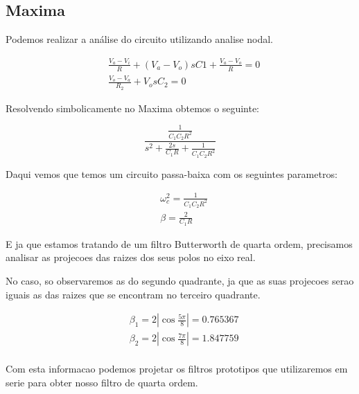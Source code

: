 \documentclass[12pt,twoside, a4paper, twocolumn]{article}
\begin{document}
\pagebreak

\subsection{Maxima}

Podemos realizar a análise do circuito utilizando analise nodal.


\begin{equation}
    \begin{aligned}
         & \frac{V_a - V_i}{R} + \left(V_a - V_o\right) s C1 + \frac{V_a - V_o}{R} = 0 \\
         & \frac{V_o - V_a}{R_2} + V_o s C_2 = 0
    \end{aligned}
\end{equation}

Resolvendo simbolicamente no Maxima obtemos o seguinte:

\begin{equation}
    \frac{\frac{1}{C_1 C_2 R^2}}{s^2 + \frac{2s}{C_1 R} + \frac{1}{C_1 C_2 R^2}}
\end{equation}

Daqui vemos que temos um circuito passa-baixa com os seguintes parametros:

\begin{equation}
    \begin{aligned}
         & \omega_c^2 = \frac{1}{C_1 C_2 R^2} \\
         & \beta = \frac{2}{C_1 R}
    \end{aligned}
\end{equation}

E ja que estamos tratando de um filtro Butterworth de quarta ordem, precisamos analisar as projecoes das raizes dos seus polos no eixo real.

No caso, so observaremos as do segundo quadrante, ja que as suas projecoes serao iguais as das raizes que se encontram no terceiro quadrante.

\begin{equation}
    \begin{aligned}
         & \beta_1 = 2 \left| \cos{\frac{5 \pi}{8}} \right| = 0.765367 \\
         & \beta_2 = 2 \left| \cos{\frac{7 \pi}{8}}\right| = 1.847759  \\
    \end{aligned}
\end{equation}

Com esta informacao podemos projetar os filtros prototipos que utilizaremos em serie para obter nosso filtro de quarta ordem.
\end{document}
